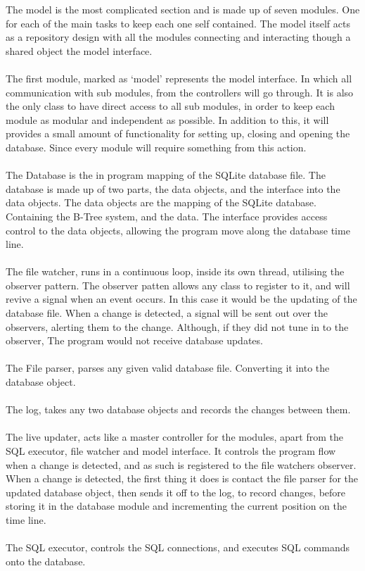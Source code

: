 The model is the most complicated section and is made up of seven modules. One for each of the main tasks to keep each one self contained. The model itself acts as a repository design with all the modules connecting and interacting though a shared object the model interface.
\\\\
The first module, marked as `model' represents the model interface. In which all communication with sub modules, from the controllers will go through. It is also the only class to have direct access to all sub modules, in order to keep each module as modular and independent as possible. In addition to this, it will provides a small amount of functionality for setting up, closing and opening the database. Since every module will require something from this action.
\\\\
The Database is the in program mapping of the SQLite database file. The database is made up of two parts, the data objects, and the interface into the data objects. The data objects are the mapping of the SQLite database. Containing the B-Tree system, and the data. The interface provides access control to the data objects, allowing the program move along the database time line.
\\\\
The file watcher, runs in a continuous loop, inside its own thread, utilising the observer pattern. The observer patten allows any class to register to it, and will revive a signal when an event occurs. In this case it would be the updating of the database file. When a change is detected, a signal will be sent out over the observers, alerting them to the change. Although, if they did not tune in to the observer, The program would not receive  database updates.
\\\\
The File parser, parses any given valid database file. Converting it into the database object.
\\\\
The log, takes any two database objects and records the changes between them.
\\\\
The live updater, acts like a master controller for the modules, apart from the SQL executor, file watcher and model interface. It controls the program flow when a change is detected, and as such is registered to the file watchers observer. When a change is detected, the first thing it does is contact the file parser for the updated database object, then sends it off to the log, to record changes, before storing it in the database module and incrementing the current position on the time line.
\\\\
The SQL executor, controls the SQL connections, and executes SQL commands onto the database.

